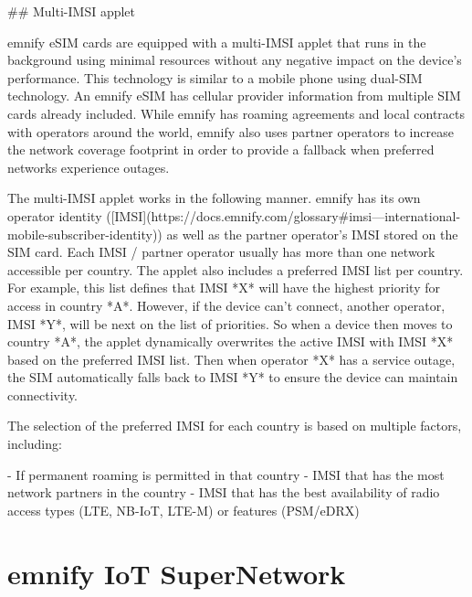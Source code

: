 \documentclass[11pt, oneside]{article}   	%
\newcommand{\addspace}{\vspace{2mm}}
\begin{document}
\begin{markdown}

## Multi-IMSI applet

emnify eSIM cards are equipped with a multi-IMSI applet that runs in the background using minimal resources without any negative impact on the device's performance.
This technology is similar to a mobile phone using dual-SIM technology.
An emnify eSIM has cellular provider information from multiple SIM cards already included.
While emnify has roaming agreements and local contracts with operators around the world, emnify also uses partner operators to increase the network coverage footprint in order to provide a fallback when preferred networks experience outages.

The multi-IMSI applet works in the following manner.
emnify has its own operator identity ([IMSI](https://docs.emnify.com/glossary#imsi---international-mobile-subscriber-identity)) as well as the partner operator's IMSI stored on the SIM card.
Each IMSI / partner operator usually has more than one network accessible per country.
The applet also includes a preferred IMSI list per country.
For example, this list defines that IMSI *X* will have the highest priority for access in country *A*.
However, if the device can't connect, another operator, IMSI *Y*, will be next on the list of priorities.
So when a device then moves to country *A*, the applet dynamically overwrites the active IMSI with IMSI *X* based on the preferred IMSI list.
Then when operator *X* has a service outage, the SIM automatically falls back to IMSI *Y* to ensure the device can maintain connectivity.

The selection of the preferred IMSI for each country is based on multiple factors, including:
\end{markdown}
\addspace
\begin{markdown}
- If permanent roaming is permitted in that country
- IMSI that has the most network partners in the country
- IMSI that has the best availability of radio access types (LTE, NB-IoT, LTE-M) or features (PSM/eDRX)
\end{markdown}
\addspace

\section{emnify IoT SuperNetwork}
\end{document}
